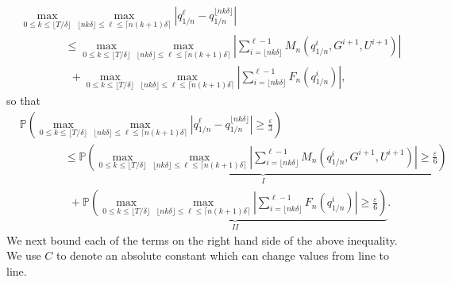 \documentclass{article}
\renewcommand{\leq}{\leqslant}
\renewcommand{\geq}{\geqslant}
\def\P{\mathbb{P}} %
\begin{document}
\[
\begin{aligned}
  & \max_{0\leq k \leq \lfloor T/\delta \rfloor}\max_{\lfloor nk\delta \rfloor \leq \ell\leq \lceil n(k+1)\delta \rceil} \left|q_{1/n}^\ell - q_{1/n}^{\lfloor nk\delta \rfloor} \right| \\
  & \qquad\qquad \leq \max_{0\leq k \leq \lfloor T/\delta \rfloor}\max_{\lfloor nk\delta \rfloor \leq \ell\leq \lceil n(k+1)\delta \rceil}\left|\sum_{i = \lfloor nk\delta \rfloor}^{\ell - 1}M_n(q^i_{1/n}, G^{i+1}, U^{i+1}) \right| \\
  & \qquad\qquad \ \ + \max_{0\leq k \leq \lfloor T/\delta \rfloor}\max_{\lfloor nk\delta \rfloor \leq \ell\leq \lceil n(k+1)\delta \rceil}\left |\sum_{i = \lfloor nk\delta \rfloor}^{\ell - 1}F_n(q^i_{1/n}) \right|,
\end{aligned}
\]
so that %
\[
\begin{aligned}
& \P \left( \max_{0\leq k \leq \lfloor T/\delta \rfloor}\max_{\lfloor nk\delta \rfloor \leq \ell\leq \lceil n(k+1)\delta \rceil} \left|q_{1/n}^\ell - q_{1/n}^{\lfloor nk\delta \rfloor}\right|\geq \frac{\varepsilon}{3} \right)\\
& \qquad\qquad \leq  \underbrace{\P \left(\max_{0\leq k \leq \lfloor T/\delta \rfloor}\max_{\lfloor nk\delta \rfloor \leq \ell\leq \lceil n(k+1)\delta \rceil}\left|\sum_{i = \lfloor nk\delta \rfloor}^{\ell - 1}M_n(q^i_{1/n}, G^{i+1}, U^{i+1}) \right| \geq\frac{\varepsilon}{6}\right)}_{I} \\
& \qquad\qquad \ \ + \underbrace{\P \left( \max_{0\leq k \leq \lfloor T/\delta \rfloor}\max_{\lfloor nk\delta \rfloor \leq \ell\leq \lceil n(k+1)\delta \rceil}\left |\sum_{i = \lfloor nk\delta \rfloor}^{\ell - 1}F_n(q^i_{1/n}) \right| \geq\frac{\varepsilon}{6}\right)}_{II}.
\end{aligned}
\]
We next bound each of the terms on the right hand side of the above inequality. We use $C$ to denote an absolute constant which can change values from line to line. 
\end{document}
